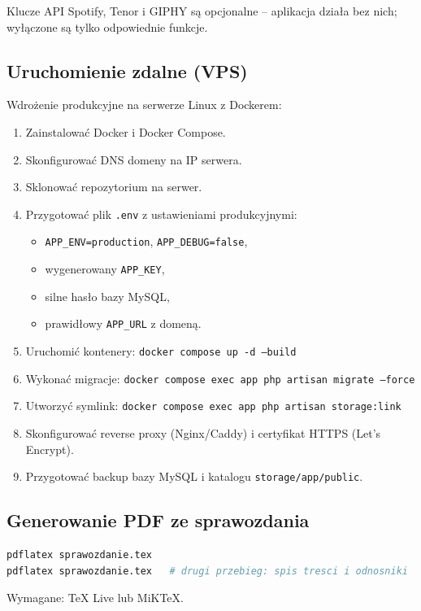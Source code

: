 \documentclass[12pt,a4paper]{article}
\begin{document}
Klucze API Spotify, Tenor i GIPHY są opcjonalne -- aplikacja działa bez nich; wyłączone są tylko odpowiednie funkcje.

\subsection{Uruchomienie zdalne (VPS)}

Wdrożenie produkcyjne na serwerze Linux z Dockerem:
\begin{enumerate}
    \item Zainstalować Docker i Docker Compose.
    \item Skonfigurować DNS domeny na IP serwera.
    \item Sklonować repozytorium na serwer.
    \item Przygotować plik \texttt{.env} z ustawieniami produkcyjnymi:
    \begin{itemize}
        \item \texttt{APP\_ENV=production}, \texttt{APP\_DEBUG=false},
        \item wygenerowany \texttt{APP\_KEY},
        \item silne hasło bazy MySQL,
        \item prawidłowy \texttt{APP\_URL} z domeną.
    \end{itemize}
    \item Uruchomić kontenery: \texttt{docker compose up -d --build}
    \item Wykonać migracje: \texttt{docker compose exec app php artisan migrate --force}
    \item Utworzyć symlink: \texttt{docker compose exec app php artisan storage:link}
    \item Skonfigurować reverse proxy (Nginx/Caddy) i certyfikat HTTPS (Let's Encrypt).
    \item Przygotować backup bazy MySQL i katalogu \texttt{storage/app/public}.
\end{enumerate}

\subsection{Generowanie PDF ze sprawozdania}

\begin{lstlisting}[language=bash]
pdflatex sprawozdanie.tex
pdflatex sprawozdanie.tex   # drugi przebieg: spis tresci i odnosniki
\end{lstlisting}

Wymagane: TeX Live lub MiKTeX.
\end{document}
